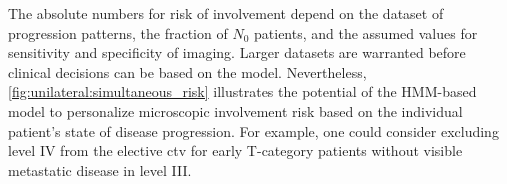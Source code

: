 \documentclass[\relativeRoot/main.tex]{subfiles}
\begin{document}
The absolute numbers for risk of involvement depend on the dataset of progression patterns, the fraction of $N_0$ patients, and the assumed values for sensitivity and specificity of imaging. Larger datasets are warranted before clinical decisions can be based on the model. Nevertheless, \cref{fig:unilateral:simultaneous_risk} illustrates the potential of the HMM-based model to personalize microscopic involvement risk based on the individual patient's state of disease progression. For example, one could consider excluding level IV from the elective \gls{ctv} for early T-category patients without visible metastatic disease in level III.
\end{document}
